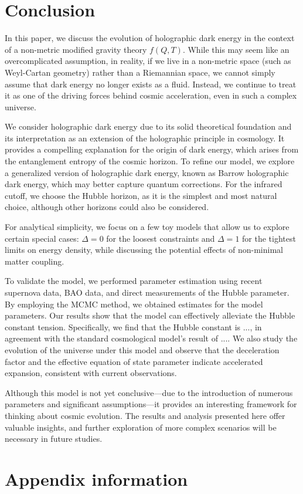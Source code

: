 \documentclass[preprint]{aastex631}
\begin{document}
\section{Conclusion}

In this paper, we discuss the evolution of holographic dark energy in the context of a non-metric modified gravity theory $f(Q,T)$. While this may seem like an overcomplicated assumption, in reality, if we live in a non-metric space (such as Weyl-Cartan geometry) rather than a Riemannian space, we cannot simply assume that dark energy no longer exists as a fluid. Instead, we continue to treat it as one of the driving forces behind cosmic acceleration, even in such a complex universe. 

We consider holographic dark energy due to its solid theoretical foundation and its interpretation as an extension of the holographic principle in cosmology. It provides a compelling explanation for the origin of dark energy, which arises from the entanglement entropy of the cosmic horizon. To refine our model, we explore a generalized version of holographic dark energy, known as Barrow holographic dark energy, which may better capture quantum corrections. For the infrared cutoff, we choose the Hubble horizon, as it is the simplest and most natural choice, although other horizons could also be considered.

For analytical simplicity, we focus on a few toy models that allow us to explore certain special cases: $\Delta=0$ for the loosest constraints and $\Delta=1$ for the tightest limits on energy density, while discussing the potential effects of non-minimal matter coupling.

To validate the model, we performed parameter estimation using recent supernova data, BAO data, and direct measurements of the Hubble parameter. By employing the MCMC method, we obtained estimates for the model parameters. Our results show that the model can effectively alleviate the Hubble constant tension. Specifically, we find that the Hubble constant is ..., in agreement with the standard cosmological model's result of .... We also study the evolution of the universe under this model and observe that the deceleration factor and the effective equation of state parameter indicate accelerated expansion, consistent with current observations.

Although this model is not yet conclusive—due to the introduction of numerous parameters and significant assumptions—it provides an interesting framework for thinking about cosmic evolution. The results and analysis presented here offer valuable insights, and further exploration of more complex scenarios will be necessary in future studies.

\appendix

\section{Appendix information}



{}

\end{document}

